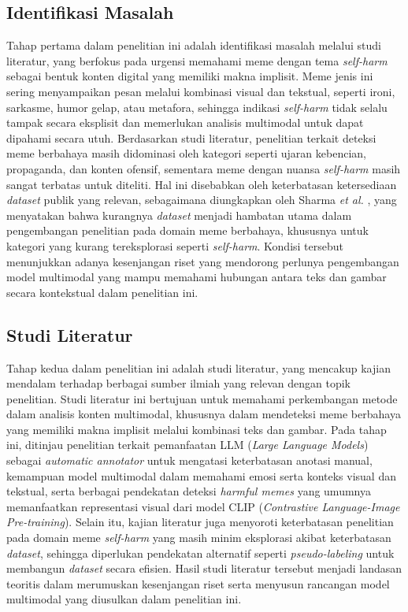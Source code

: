 \subsection{Identifikasi Masalah} \label{subsec:identifikasi_masalah}
Tahap pertama dalam penelitian ini adalah identifikasi masalah  melalui studi literatur, yang berfokus pada urgensi memahami meme dengan tema \textit{self-harm} sebagai bentuk konten digital yang memiliki makna implisit. Meme jenis ini sering menyampaikan pesan melalui kombinasi visual dan tekstual, seperti ironi, sarkasme, humor gelap, atau metafora, sehingga indikasi \textit{self-harm} tidak selalu tampak secara eksplisit dan memerlukan analisis multimodal untuk dapat dipahami secara utuh. Berdasarkan studi literatur, penelitian terkait deteksi meme berbahaya masih didominasi oleh kategori seperti ujaran kebencian, propaganda, dan konten ofensif, sementara meme dengan nuansa \textit{self-harm} masih sangat terbatas untuk diteliti. Hal ini disebabkan oleh keterbatasan ketersediaan \textit{dataset} publik yang relevan, sebagaimana diungkapkan oleh Sharma \textit{et al.} \cite{Sharma2022HarmfulMemes}, yang menyatakan bahwa kurangnya \textit{dataset} menjadi hambatan utama dalam pengembangan penelitian pada domain meme berbahaya, khususnya untuk kategori yang kurang tereksplorasi seperti \textit{self-harm}. Kondisi tersebut menunjukkan adanya kesenjangan riset yang mendorong perlunya pengembangan model multimodal yang mampu memahami hubungan antara teks dan gambar secara kontekstual dalam penelitian ini.

\subsection{Studi Literatur} \label{subsec:studi_literatur}
Tahap kedua dalam penelitian ini adalah studi literatur, yang mencakup kajian mendalam terhadap berbagai sumber ilmiah yang relevan dengan topik penelitian. Studi literatur ini bertujuan untuk memahami perkembangan metode dalam analisis konten multimodal, khususnya dalam mendeteksi meme berbahaya yang memiliki makna implisit melalui kombinasi teks dan gambar. Pada tahap ini, ditinjau penelitian terkait pemanfaatan LLM (\textit{Large Language Models}) sebagai \textit{automatic annotator} untuk mengatasi keterbatasan anotasi manual, kemampuan model multimodal dalam memahami emosi serta konteks visual dan tekstual, serta berbagai pendekatan deteksi \textit{harmful memes} yang umumnya memanfaatkan representasi visual dari model CLIP (\textit{Contrastive Language-Image Pre-training}). Selain itu, kajian literatur juga menyoroti keterbatasan penelitian pada domain meme \textit{self-harm} yang masih minim eksplorasi akibat keterbatasan \textit{dataset}, sehingga diperlukan pendekatan alternatif seperti \textit{pseudo-labeling} untuk membangun \textit{dataset} secara efisien. Hasil studi literatur tersebut menjadi landasan teoritis dalam merumuskan kesenjangan riset serta menyusun rancangan model multimodal yang diusulkan dalam penelitian ini.

